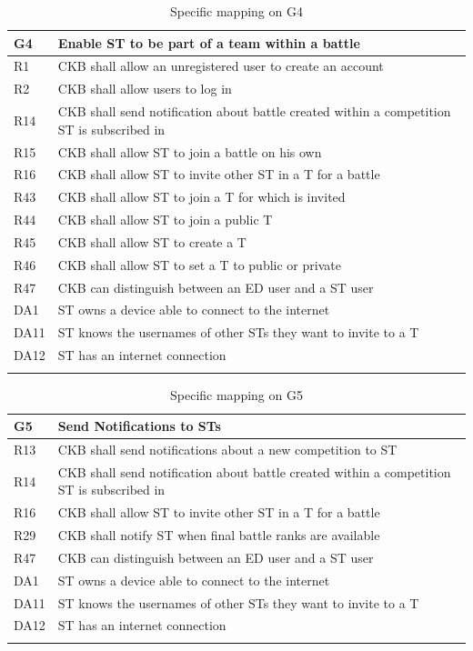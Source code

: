   \begin{longtable}{|l|p{12cm}|}
    \hline
    \textbf{G4} & \textbf{Enable ST to be part of a team within a battle}      \\
    \hline
    R1 & CKB shall allow an unregistered user to create an account \\
    \hline
    R2 & CKB shall allow users to log in \\
    \hline
    R14 & CKB shall send notification about battle created within a competition ST is subscribed in \\
    \hline
    R15 & CKB shall allow ST to join a battle on his own \\
    \hline
    R16 & CKB shall allow ST to invite other ST in a T for a battle \\
    \hline
    R43 & CKB shall allow ST to join a T for which is invited \\
    \hline
    R44 & CKB shall allow ST to join a public T \\
    \hline
    R45 & CKB shall allow ST to create a T \\
    \hline
    R46 & CKB shall allow ST to set a T to public or private \\
    \hline
    R47 & CKB can distinguish between an ED user and a ST user \\
    \hline
    DA1 & ST owns a device able to connect to the internet \\
    \hline
    DA11 & ST knows the usernames of other STs they want to invite to a T \\
    \hline
    DA12 & ST has an internet connection \\
    \hline

    \caption{Specific mapping on G4}
    \label{tab:mappingG4}
  \end{longtable}

  \begin{longtable}{|l|p{12cm}|}
    \hline
    \textbf{G5} & \textbf{Send Notifications to STs}      \\
    \hline
    R13 & CKB shall send notifications about a new competition to ST \\
    \hline
    R14 & CKB shall send notification about battle created within a competition ST is subscribed in \\
    \hline
    R16 & CKB shall allow ST to invite other ST in a T for a battle \\
    \hline
    R29 & CKB shall notify ST when final battle ranks are available \\
    \hline
    R47 & CKB can distinguish between an ED user and a ST user \\
    \hline
    DA1 & ST owns a device able to connect to the internet \\
    \hline
    DA11 & ST knows the usernames of other STs they want to invite to a T \\
    \hline
    DA12 & ST has an internet connection \\
    \hline

    \caption{Specific mapping on G5}
    \label{tab:mappingG5}
  \end{longtable}

